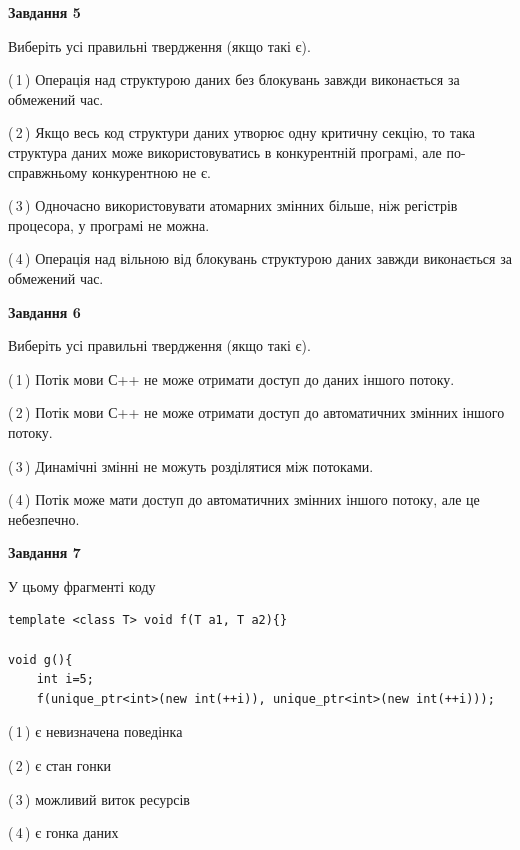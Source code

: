 \documentclass[12pt, ukrainian]{article}
\begin{document}
\begin {large}
{\begin{center}
\textbf{Завдання 5}
\end{center}

Виберіть усі правильні твердження (якщо такі є).\par
\vspace{2mm}

(\,1\,) Операція над структурою даних без блокувань завжди виконається за обмежений час.%

(\,2\,) Якщо весь код структури даних утворює одну критичну секцію, то така структура даних може використовуватись в конкурентній програмі, але по-справжньо\-му конкурентною не є.%

(\,3\,) Одночасно використовувати атомарних змінних більше, ніж регістрів процесора, у програмі не можна.%

(\,4\,) Операція над вільною від блокувань структурою даних завжди виконається за обмежений час.%
\newpage


\begin{center}
\textbf{Завдання 6}
\end{center}

Виберіть усі правильні твердження (якщо такі є).\par
\vspace{2mm}

(\,1\,) Потік мови С++ не може отримати доступ до даних іншого потоку.%

(\,2\,) Потік мови С++ не може отримати доступ до автоматичних змінних іншого потоку.%

(\,3\,) Динамічні змінні не можуть розділятися між потоками.%

(\,4\,) Потік може мати доступ до автоматичних змінних іншого потоку, але це небезпечно.%


\begin{center}
\textbf{Завдання 7}
\end{center}

У цьому фрагменті коду
\begin{verbatim}
template <class T> void f(T a1, T a2){}

void g(){
    int i=5;
    f(unique_ptr<int>(new int(++i)), unique_ptr<int>(new int(++i)));
\end{verbatim}

(\,1\,) є невизначена поведінка%

(\,2\,) є стан гонки%

(\,3\,) можливий виток ресурсів%

(\,4\,) є гонка даних%

}
\end {large}

\vspace{4mm}
\newpage
\end{document}
